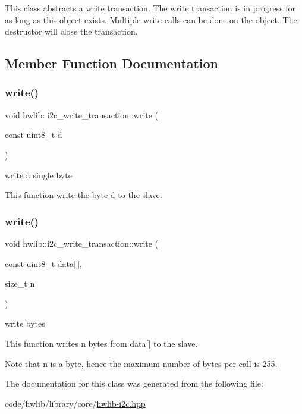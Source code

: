 This class abstracts a write transaction. The write transaction is in progress for as long as this object exists. Multiple write calls can be done on the object. The destructor will close the transaction. 

\subsection{Member Function Documentation}
\mbox{\label{classhwlib_1_1i2c__write__transaction_a15fdb954f92b784f2d723892b57f6728}} 
\subsubsection{\texorpdfstring{write()}{write()}\hspace{0.1cm}{\footnotesize\ttfamily [1/2]}}
{\footnotesize\ttfamily void hwlib\+::i2c\+\_\+write\+\_\+transaction\+::write (\begin{DoxyParamCaption}\item[{const uint8\+\_\+t}]{d }\end{DoxyParamCaption})\hspace{0.3cm}{\ttfamily [inline]}}

write a single byte

This function write the byte d to the slave. \mbox{\label{classhwlib_1_1i2c__write__transaction_a518cffb445b15fc027d2689f17ef45e8}} 
\subsubsection{\texorpdfstring{write()}{write()}\hspace{0.1cm}{\footnotesize\ttfamily [2/2]}}
{\footnotesize\ttfamily void hwlib\+::i2c\+\_\+write\+\_\+transaction\+::write (\begin{DoxyParamCaption}\item[{const uint8\+\_\+t}]{data\mbox{[}$\,$\mbox{]},  }\item[{size\+\_\+t}]{n }\end{DoxyParamCaption})\hspace{0.3cm}{\ttfamily [inline]}}

write bytes

This function writes n bytes from data\mbox{[}\mbox{]} to the slave.

Note that n is a byte, hence the maximum number of bytes per call is 255. 

The documentation for this class was generated from the following file\+:\begin{DoxyCompactItemize}
\item 
code/hwlib/library/core/\hyperlink{hwlib-i2c_8hpp}{hwlib-\/i2c.\+hpp}\end{DoxyCompactItemize}
